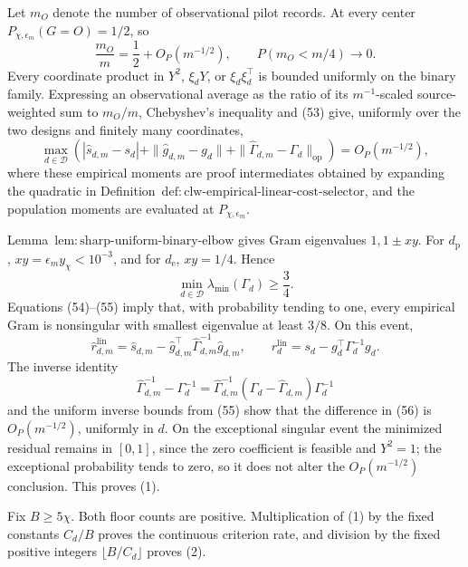 Let \(m_O\) denote the number of observational pilot records.  At every center \(P_{\chi,\epsilon_m}(G=O)=1/2\), so
\[
 \frac{m_O}{m}=\frac12+O_P(m^{-1/2}),
 \qquad P(m_O<m/4)\longrightarrow0.                       \tag{53}
\]
Every coordinate product in \(Y^2\), \(\xi_dY\), or \(\xi_d\xi_d^\top\) is bounded uniformly on the binary family.  Expressing an observational average as the ratio of its \(m^{-1}\)-scaled source-weighted sum to \(m_O/m\), Chebyshev's inequality and (53) give, uniformly over the two designs and finitely many coordinates,
\[
 \max_{d\in\mathcal D}\left(
 |\widehat s_{d,m}-s_d|
 +\|\widehat g_{d,m}-g_d\|
 +\|\widehat\Gamma_{d,m}-\Gamma_d\|_{\mathrm{op}}
 \right)=O_P(m^{-1/2}),                                   \tag{54}
\]
where these empirical moments are proof intermediates obtained by expanding the quadratic in Definition~\(\mathrm{def{:}clw\text{-}empirical\text{-}linear\text{-}cost\text{-}selector}\), and the population moments are evaluated at \(P_{\chi,\epsilon_m}\).

Lemma~\(\mathrm{lem{:}sharp\text{-}uniform\text{-}binary\text{-}elbow}\) gives Gram eigenvalues \(1,1\pm xy\).  For \(d_{\mathrm p}\), \(xy=\epsilon_my_\chi<10^{-3}\), and for \(d_{\mathrm e}\), \(xy=1/4\).  Hence
\[
 \min_{d\in\mathcal D}\lambda_{\min}(\Gamma_d)\ge\frac34. \tag{55}
\]
Equations (54)--(55) imply that, with probability tending to one, every empirical Gram is nonsingular with smallest eigenvalue at least \(3/8\).  On this event,
\[
 \widehat r_{d,m}^{\mathrm{lin}}
 =\widehat s_{d,m}-\widehat g_{d,m}^\top
 \widehat\Gamma_{d,m}^{-1}\widehat g_{d,m},
 \qquad
 r_d^{\mathrm{lin}}=s_d-g_d^\top\Gamma_d^{-1}g_d.          \tag{56}
\]
The inverse identity
\[
 \widehat\Gamma_{d,m}^{-1}-\Gamma_d^{-1}
 =\widehat\Gamma_{d,m}^{-1}
 (\Gamma_d-\widehat\Gamma_{d,m})\Gamma_d^{-1}             \tag{57}
\]
and the uniform inverse bounds from (55) show that the difference in (56) is \(O_P(m^{-1/2})\), uniformly in \(d\).  On the exceptional singular event the minimized residual remains in \([0,1]\), since the zero coefficient is feasible and \(Y^2=1\); the exceptional probability tends to zero, so it does not alter the \(O_P(m^{-1/2})\) conclusion.  This proves (1).

Fix \(B\ge5\chi\).  Both floor counts are positive.  Multiplication of (1) by the fixed constants \(C_d/B\) proves the continuous criterion rate, and division by the fixed positive integers \(\lfloor B/C_d\rfloor\) proves (2).

